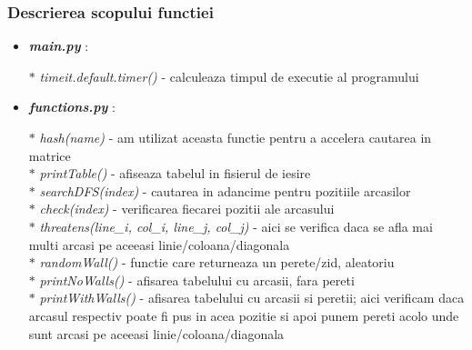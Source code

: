 \documentclass{article}
\begin{document}
\subsubsection{Descrierea scopului functiei}
\begin{itemize}
        \item \textit{\textbf{main.py}} : 
            
                \hspace*{0.5cm} $\ast$ \textit{timeit.default.timer()} - calculeaza timpul de executie al programului
            
        \item \textit{\textbf{functions.py}} : 
            
                \hspace*{0.5cm} $\ast$ \textit{hash(name)} - am utilizat aceasta functie pentru a accelera cautarea in matrice \\
                \hspace*{0.5cm} $\ast$ \textit{printTable()} - afiseaza tabelul in fisierul de iesire \\
                \hspace*{0.5cm} $\ast$ \textit{searchDFS(index)} - cautarea in adancime pentru pozitiile arcasilor \\
                \hspace*{0.5cm} $\ast$ \textit{check(index)} - verificarea fiecarei pozitii ale arcasului \\
                \hspace*{0.5cm} $\ast$ \textit{threatens(line\_i, col\_i, line\_j, col\_j)} - aici se verifica daca se afla mai multi arcasi pe aceeasi linie/coloana/diagonala \\
                \hspace*{0.5cm} $\ast$ \textit{randomWall()} - functie care returneaza un perete/zid, aleatoriu \\
                \hspace*{0.5cm} $\ast$ \textit{printNoWalls()} - afisarea tabelului cu arcasii, fara pereti \\
                \hspace*{0.5cm} $\ast$ \textit{printWithWalls()} - afisarea tabelului cu arcasii si peretii; aici verificam daca arcasul respectiv poate fi pus in acea pozitie si apoi punem pereti acolo unde sunt arcasi pe aceeasi linie/coloana/diagonala
            
\end{itemize}
\end{document}
